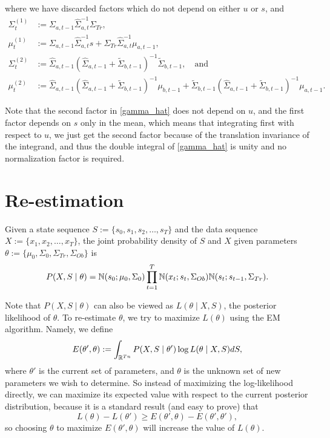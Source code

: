 \documentclass[12pt,leqno]{article}
\begin{document}
  where we have discarded factors which do not depend on either $u$ or $s$, and 
  \begin{align*}
    \Sigma^{(1)}_t &:= \Sigma_{a,t-1}\widehat{\Sigma}_{a,t}^{-1}\Sigma_{Tr},\\
    \mu^{(1)}_t &:= \Sigma_{a,t-1}\widehat{\Sigma}_{a,t}^{-1}s + \Sigma_{Tr}\widehat{\Sigma}_{a,t}^{-1}\mu_{a,t-1},\\
    \Sigma^{(2)}_t &:= \widehat{\Sigma}_{a,t-1}(\widehat{\Sigma}_{a,t-1}+\widetilde{\Sigma}_{b,t-1})^{-1}\widetilde{\Sigma}_{b,t-1},     \quad\text{and}\\
    \mu^{(2)}_t &:= \widehat{\Sigma}_{a,t-1}(\widehat{\Sigma}_{a,t-1}+\widetilde{\Sigma}_{b,t-1})^{-1}\mu_{b,t-1} +
    \widetilde{\Sigma}_{b,t-1}(\widehat{\Sigma}_{a,t-1} + \widetilde{\Sigma}_{b,t-1})^{-1}\mu_{a,t-1}.
  \end{align*}

  Note that the second factor in \eqref{gamma_hat} does not depend on $u$, and the first factor depends on $s$
  only in the mean, which means that integrating first with respect to $u$, we just get the second factor
  because of the translation
  invariance of the integrand, and thus the double integral of \eqref{gamma_hat} is unity and no normalization factor is
  required.
  
\section{Re-estimation}
Given a state sequence $S := \{s_0,s_1,s_2,\dots,s_T\}$ and the data sequence $X := \{x_1,x_2,\dots,x_T\}$, the
joint probability density of $S$ and $X$ given parameters $\theta := \{\mu_0,\Sigma_0,\Sigma_{Tr},\Sigma_{Ob}\}$ is
$$
P(X,S\mid\theta) = {\mathbb N}(s_0;\mu_0,\Sigma_0)\prod_{t=1}^T{\mathbb N}(x_t;s_t,\Sigma_{Ob}){\mathbb N}(s_t;s_{t-1},\Sigma_{Tr}).
$$

Note that $P(X,S\mid\theta)$ can also be viewed as  $L(\theta\mid X,S)$, the posterior likelihood of $\theta$.
To re-estimate $\theta$, we try to maximize $L(\theta)$ using the EM algorithm. Namely, we define 
$$
E(\theta',\theta) := \int_{{\mathbb R}^{Tn}}P(X,S\mid\theta')\log{L(\theta\mid X,S)}dS,
$$
where $\theta'$ is the current set of parameters, and $\theta$ is the unknown set of new parameters
we wish to determine. So instead of maximizing the log-likelihood directly, we can maximize its expected
value with respect to the current posterior distribution, because it is a standard result (and easy to prove) that
$$
L(\theta) - L(\theta') \ge E(\theta',\theta) - E(\theta',\theta'),
$$
so choosing $\theta$ to maximize $E(\theta',\theta)$ will increase the value of $L(\theta)$.
\end{document}
